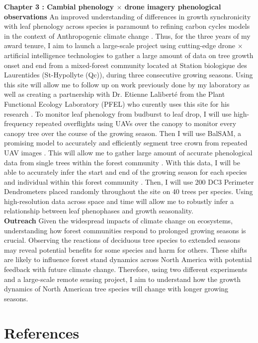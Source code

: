 \documentclass[12pt]{article}
\begin{document}
\textbf{Chapter 3 : Cambial phenology $\times$ drone imagery phenological observations}
An improved understanding of differences in growth synchronicity with leaf phenology across species is paramount to refining carbon cycles models in the context of Anthropogenic climate change \citep{klein_coordination_2016,kramer_importance_2000,richardson_climate_2013,swidrak_comparing_2013}. Thus, for the three years of my award tenure, I aim to launch a large-scale project using cutting-edge drone $\times$  artificial intelligence technologies \citep{ball_accurate_2023,teng_bringing_2025,ulku_deep_2022} to gather a large amount of data on tree growth onset and end from a mixed-forest community located at Station biologique des Laurentides (St-Hypollyte (Qc)), during three consecutive growing seasons. Using this site will allow me to follow up on work previously done by my laboratory \citep{flynn_temperature_2018} as well as creating a partnership with Dr. Etienne Laliberté from the Plant Functional Ecology Laboratory (PFEL) who curently uses this site for his research \citep{cloutier_influence_2024}. To monitor leaf phenology from budburst to leaf drop, I will use high-frequency repeated overflights using UAVs over the canopy to monitor every canopy tree over the course of the growing season. Then I will use BalSAM, a promising model to accurately and efficiently segment tree crown from repeated UAV images \citep{teng_bringing_2025}. This will allow me to gather large amount of accurate phenological data from single trees within the forest community \citep{teng_bringing_2025}. With this data, I will be able to accurately infer the start and end of the growing season for each species and individual within this forest community \citep{berra_assessing_2019,fawcett_monitoring_2021}. Then, I will use 200 DC3 Perimeter Dendrometers placed randomly throughout the site on 40 trees per species. Using high-resolution data across space and time will allow me to robustly infer a relationship between leaf phenophases and growth seasonality.\\


\textbf{Outreach}
Given the widespread impacts of climate change on ecosystems, understanding how forest communities respond to prolonged growing seasons is crucial. Observing the reactions of deciduous tree species to extended seasons may reveal potential benefits for some species and harm for others. These shifts are likely to influence forest stand dynamics across North America with potential feedback with future climate change. Therefore, using two different experiments and a large-scale remote sensing project, I aim to understand how the growth dynamics of North American tree species will change with longer growing seasons.  

\section*{References}

\end{document}
